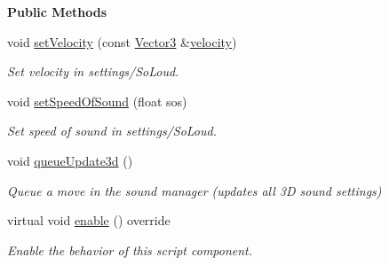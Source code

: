 \begin{Indent}\textbf{ Public Methods}\par
\begin{DoxyCompactItemize}
\item 
\mbox{\label{classrev_1_1_audio_listener_component_a38b977ad6aedbbc5e13a517a9a956dce}} 
void \mbox{\hyperlink{classrev_1_1_audio_listener_component_a38b977ad6aedbbc5e13a517a9a956dce}{set\+Velocity}} (const \mbox{\hyperlink{classrev_1_1_vector}{Vector3}} \&\mbox{\hyperlink{classrev_1_1_audio_listener_component_a8f590b05fd17edbeb83494b5e7458f7f}{velocity}})
\begin{DoxyCompactList}\small\item\em Set velocity in settings/\+So\+Loud. \end{DoxyCompactList}\item 
void \mbox{\hyperlink{classrev_1_1_audio_listener_component_a8a47dd43d295e34e3e5e93597afe546f}{set\+Speed\+Of\+Sound}} (float sos)
\begin{DoxyCompactList}\small\item\em Set speed of sound in settings/\+So\+Loud. \end{DoxyCompactList}\item 
\mbox{\label{classrev_1_1_audio_listener_component_a480424b8eb2c87e42d6b1b1e3700cfe7}} 
void \mbox{\hyperlink{classrev_1_1_audio_listener_component_a480424b8eb2c87e42d6b1b1e3700cfe7}{queue\+Update3d}} ()
\begin{DoxyCompactList}\small\item\em Queue a move in the sound manager (updates all 3D sound settings) \end{DoxyCompactList}\item 
\mbox{\label{classrev_1_1_audio_listener_component_a8facc61284d885010254c7a357bc0c85}} 
virtual void \mbox{\hyperlink{classrev_1_1_audio_listener_component_a8facc61284d885010254c7a357bc0c85}{enable}} () override
\begin{DoxyCompactList}\small\item\em Enable the behavior of this script component. \end{DoxyCompactList}\item 
\mbox{\label{classrev_1_1_audio_listener_component_a3809571f948758cb566a3c34f3523009}} 

\end{DoxyCompactItemize}
\end{Indent}
